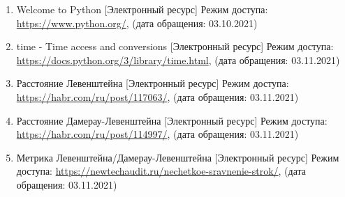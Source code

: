 
\begin{enumerate}
	\item Welcome to Python [Электронный ресурс] Режим доступа: \url{https://www.python.org/}, (дата обращения: 03.10.2021)
	\item time - Time access and conversions [Электронный ресурс] Режим доступа:
	\url{https://docs.python.org/3/library/time.html}, (дата обращения: 03.11.2021)
	\item Расстояние Левенштейна [Электронный ресурс] Режим доступа: \url{https://habr.com/ru/post/117063/}, (дата обращения: 03.11.2021)
	\item Расстояние Дамерау-Левенштейна [Электронный ресурс] Режим доступа: \url{https://habr.com/ru/post/114997/}, (дата обращения: 03.11.2021)
	\item Метрика Левенштейна/Дамерау-Левенштейна [Электронный ресурс] Режим доступа:
	\url{https://newtechaudit.ru/nechetkoe-sravnenie-strok/}, (дата обращения: 03.11.2021)
\end{enumerate}
